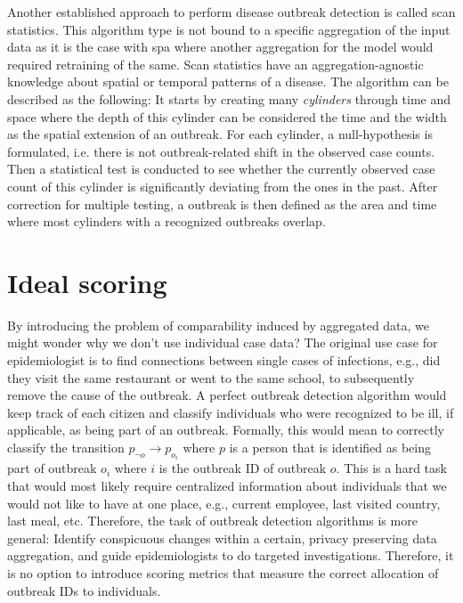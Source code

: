 \documentclass[a4paper, 12pt, one column]{article}
\begin{document}
Another established approach to perform disease outbreak detection is called scan statistics. This algorithm type is not bound to a specific aggregation of the input data as it is the case with \ac{spa} where another aggregation for the model would required retraining of the same. Scan statistics have an aggregation-agnostic knowledge about spatial or temporal patterns of a disease. The algorithm can be described as the following: It starts by creating many \emph{cylinders} through time and space where the depth of this cylinder can be considered the time and the width as the spatial extension of an outbreak. For each cylinder, a null-hypothesis is formulated, i.e. there is not outbreak-related shift in the observed case counts. Then a statistical test is conducted to see whether the currently observed case count of this cylinder is significantly deviating from the ones in the past. After correction for multiple testing, a outbreak is then defined as the area and time where most cylinders with a recognized outbreaks overlap.

\section{Ideal scoring}

By introducing the problem of comparability induced by aggregated data, we might wonder why we don't use individual case data? The original use case for epidemiologist is to find connections between single cases of infections, e.g., did they visit the same restaurant or went to the same school, to subsequently remove the cause of the outbreak. A perfect outbreak detection algorithm would keep track of each citizen and classify individuals who were recognized to be ill, if applicable, as being part of an outbreak. Formally, this would mean to correctly classify the transition \(p_{\neg o} \to p_{o_i}\) where \(p\) is a person that is identified as being part of outbreak \(o_i\) where \(i\) is the outbreak ID of outbreak \(o\). This is a hard task that would most likely require centralized information about individuals that we would not like to have at one place, e.g., current employee, last visited country, last meal, etc. Therefore, the task of outbreak detection algorithms is more general: Identify conspicuous changes within a certain, privacy preserving data aggregation, and guide epidemiologists to do targeted investigations. Therefore, it is no option to introduce scoring metrics that measure the correct allocation of outbreak IDs to individuals.
\end{document}
